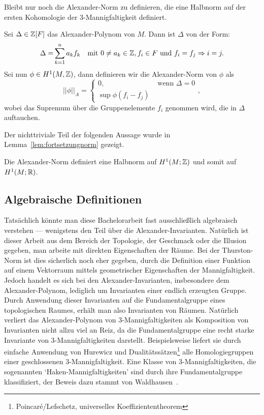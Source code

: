     	Bleibt nur noch die Alexander-Norm zu definieren, die eine Halbnorm auf der ersten Kohomologie der 3-Mannigfaltigkeit definiert.
    	\begin{defn}
    		Sei  $\Delta \in \mathbb{Z} [F]$ das Alexander-Polynom von $M$. Dann ist $\Delta$ von der Form:
    		\begin{align*}
    		    			\Delta = &\sum_{k=1}^n a_k f_k&\text{mit } 0 \neq a_k \in \mathbb{Z}, f_i \in F \text{ und } f_i = f_j \Rightarrow i=j.
    		\end{align*}
    		Sei nun $\phi \in H^1 (M,\mathbb{Z})$, dann definieren wir die Alexander-Norm von $\phi$ als
    		\[
    			||\phi||_A = \begin{cases}
    				0 , &\text{ wenn } \Delta=0\\
    				\sup \phi (f_i - f_j) &
    			\end{cases},
    		\]
    		wobei das Supremum über die Gruppenelemente $f_i$ genommen wird, die in $\Delta$ auftauchen.
    	\end{defn}

    	Der nichttriviale Teil der folgenden Aussage wurde in Lemma~\ref{lem:fortsetzungnorm} gezeigt.
    	\begin{lem}
    	\label{lem:alexdefinesseminorm}
    		Die Alexander-Norm definiert eine Halbnorm auf $H^1(M;\mathbb{Z})$ und somit auf $H^1(M;\mathbb{R})$.
    	\end{lem}


    \subsection{Algebraische Definitionen}
\label{sec:algebra}

Tatsächlich könnte man diese Bachelorarbeit fast ausschließlich algebraisch verstehen --- wenigstens den Teil über die Alexander-Invarianten. Natürlich ist dieser Arbeit aus dem Bereich der Topologie, der Geschmack oder die Illusion gegeben, man arbeite mit direkten Eigenschaften der Räume. Bei der Thurston-Norm ist dies sicherlich noch eher gegeben, durch die Definition einer Funktion auf einem Vektorraum mittels geometrischer Eigenschaften der Mannigfaltigkeit. Jedoch handelt es sich bei den Alexander-Invarianten, insbesondere dem Alexander-Polynom, lediglich um Invarianten einer endlich erzeugten Gruppe. Durch Anwendung dieser Invarianten auf die Fundamentalgruppe eines topologischen Raumes, erhält man also Invarianten von Räumen. Natürlich verliert das Alexander-Polynom von 3-Mannigfaltigkeiten als Komposition von Invarianten nicht allzu viel an Reiz, da die Fundamentalgruppe eine recht starke Invariante von 3-Mannigfaltigkeiten darstellt. Beispielsweise liefert sie durch einfache Anwendung von Hurewicz und Dualitätssätzen\footnote{Poincaré/Lefschetz, universelles Koeffiziententheorem} alle Homologiegruppen einer geschlossenen 3-Mannigfaltigkeit. Eine Klasse von 3-Mannigfaltigkeiten, die sogenannten `Haken-Mannigfaltigkeiten' sind durch ihre Fundamentalgruppe klassifiziert, der Beweis dazu stammt von Waldhausen~\cite{Waldhausen.1968}. 

